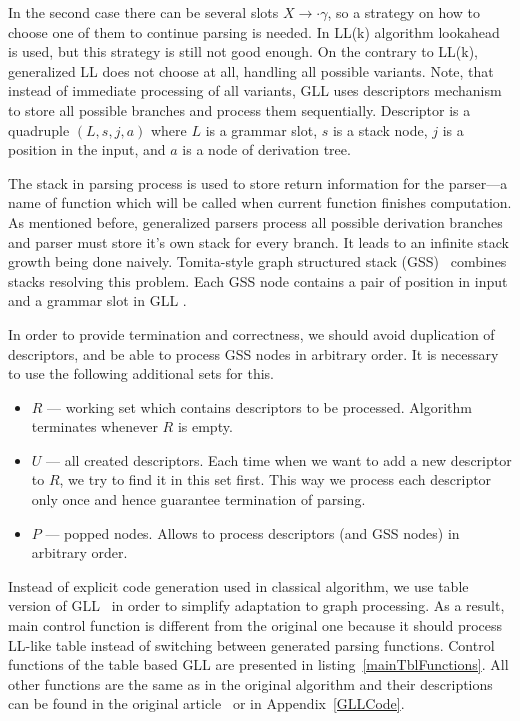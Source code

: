In the second case there can be several slots $X \rightarrow \cdot \gamma$, so a strategy on how to choose one of them to continue parsing is needed.
In LL(k) algorithm lookahead is used, but this strategy is still not good enough.
On the contrary to LL(k), generalized LL does not choose at all, handling all possible variants.
Note, that instead of immediate processing of all variants, GLL uses descriptors mechanism to store all possible branches and process them sequentially. 
Descriptor is a quadruple $(L, s, j, a)$ where $L$ is a grammar slot, $s$ is a stack node, $j$ is a position in the input, and $a$ is a node of derivation tree. 

The stack in parsing process is used to store return information for the parser---a name of function which will be called when current function finishes computation. 
As mentioned before, generalized parsers process all possible derivation branches and parser must store it's own stack for every branch. 
It leads to an infinite stack growth being done naively.  
Tomita-style graph structured stack (GSS)~\cite{Tomita} combines stacks resolving this problem.
Each GSS node contains a pair of position in input and a grammar slot in GLL . 

In order to provide termination and correctness, we should avoid duplication of descriptors, and be able to process GSS nodes in arbitrary order. It is necessary to use the following additional sets for this.
\begin{itemize}
\item $R$ --- working set which contains descriptors to be processed. Algorithm terminates whenever $R$ is empty.
\item $U$ --- all created descriptors. Each time when we want to add a new descriptor to $R$, we try to find it in this set first.
This way we process each descriptor only once and hence guarantee termination of parsing.
\item $P$ --- popped nodes. Allows to process descriptors (and GSS nodes) in arbitrary order. 
\end{itemize}

Instead of explicit code generation used in classical algorithm, we use table version of GLL~\cite{TableGLL} in order to simplify adaptation to graph processing.
As a result, main control function is different from the original one because it should process LL-like table instead of switching between generated parsing functions.
Control functions of the table based GLL are presented in listing~\ref{mainTblFunctions}.
All other functions are the same as in the original algorithm and their descriptions can be found in the original article~\cite{scott2010gll} or in Appendix~\ref{GLLCode}.

